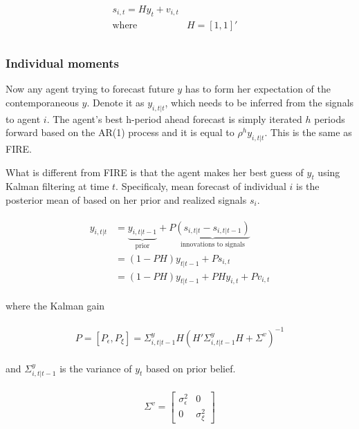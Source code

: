 \documentclass[]{article}
\begin{document}
\begin{eqnarray}
\begin{aligned}
s_{i,t} = H y_{t} + v_{i,t} \\
\text{where } & H=[1,1]' \quad \\
\end{aligned}
\end{eqnarray}


\subsubsection{Individual moments }

Now any agent trying to forecast future $y$ has to form her expectation of the contemporaneous $y$. Denote it as  $y_{i,t|t}$, which needs to be inferred from the signals to agent $i$. The agent's best h-period ahead forecast is simply iterated $h$ periods forward based on the AR(1) process and it is equal to $\rho^h y_{i,t|t}$. This is the same as FIRE.

What is different from FIRE is that the agent makes her best guess of $y_t$ using Kalman filtering at time $t$. Specificaly, mean forecast of individual $i$ is the posterior mean of based on her prior and realized signals $s_i$. 


\begin{eqnarray}
\begin{aligned}
y_{i,t|t}  
& =  \underbrace{y_{i,t|t-1}}_{\text{prior}} + P \underbrace {(s_{i,t|t}-s_{i,t|t-1})}_{\text{innovations to signals}} \\
& = (1-PH) y_{t|t-1} + Ps_{i,t} \\
& = (1-PH) y_{t|t-1} + PH y_{i,t} + P v_{i,t} 
\end{aligned}
\end{eqnarray}

where the Kalman gain  


\begin{eqnarray}
\begin{aligned}
 P = [P_\epsilon,P_\xi]= \Sigma^y_{i,t|t-1} H(H'\Sigma^y_{i,t|t-1} H + \Sigma^v)^{-1} 
 \end{aligned}
 \end{eqnarray}
 
and $\Sigma^y_{i,t|t-1}$  is the variance of  $y_t$ based on prior belief.

\begin{eqnarray}
\begin{aligned}
 \Sigma^v =  \left[ \begin{matrix} 
  \sigma^2_{\epsilon} &  0 \\ 
  0 & \sigma^2_\xi \end{matrix}\right] 
\end{aligned}
\end{eqnarray}
\end{document}
